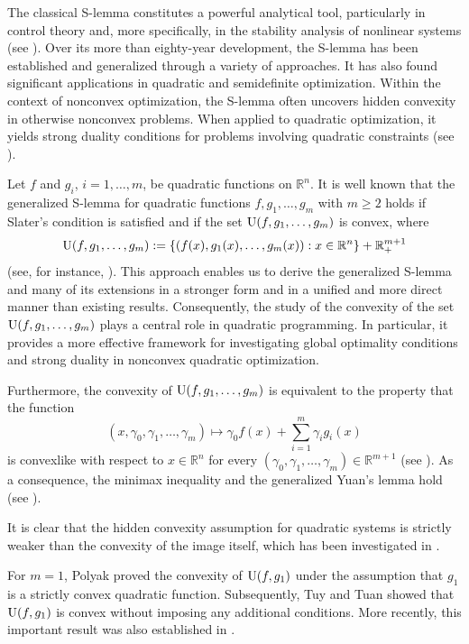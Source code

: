 \documentclass[]{interact}
\theoremstyle{plain}%
\theoremstyle{definition}
\theoremstyle{remark}
\begin{document}
	The classical S-lemma constitutes a powerful analytical tool, particularly in control theory
	and, more specifically, in the stability analysis of nonlinear systems
	(see \cite{PolikTerlaky2007}).
	Over its more than eighty-year development, the S-lemma has been established and generalized
	through a variety of approaches.
	It has also found significant applications in quadratic and semidefinite optimization.
	Within the context of nonconvex optimization, the S-lemma often uncovers hidden convexity
	in otherwise nonconvex problems.
	When applied to quadratic optimization, it yields strong duality conditions
	for problems involving quadratic constraints
	(see \cite{Tuy2016,BeckEldar2006,TuyTuan2013,JeyakumarHuyLi2009,JeyakumarLi2014,PolikTerlaky2007}).
	
	Let $f$ and $g_i$, $i=1,\ldots,m$, be quadratic functions on $\mathbb{R}^n$.
	It is well known that the generalized S-lemma for quadratic functions
	$f, g_1,\ldots,g_m$ with $m\geq 2$ holds if Slater's condition is satisfied
	and if the set ${\rm U}(f,g_1,\ldots,g_m)$ is convex, where
	$${\rm U}(f,g_1,\ldots,g_m):=
	\{(f(x), g_1(x), \ldots, g_m(x)) : x\in \mathbb{R}^n\} + \mathbb{R}^{m+1}_+$$
	(see, for instance, \cite{Fradkov1973,LaraUrruty2022}).
	This approach enables us to derive the generalized S-lemma and many of its extensions
	in a stronger form and in a unified and more direct manner than existing results.
	Consequently, the study of the convexity of the set ${\rm U}(f,g_1,\ldots,g_m)$
	plays a central role in quadratic programming.
	In particular, it provides a more effective framework for investigating
	global optimality conditions and strong duality in nonconvex quadratic optimization.
	
	
	
	Furthermore, the convexity of ${\rm U}(f,g_1,\ldots,g_m)$ is equivalent to the property that the function
	$$(x, \gamma_0, \gamma_1,\ldots, \gamma_m)\mapsto \gamma_0 f(x)+\sum_{i=1}^{m}\gamma_i g_i(x)$$
	is convexlike with respect to $x\in \mathbb{R}^n$ for every
	$(\gamma_0, \gamma_1,\ldots,\gamma_m)\in \mathbb{R}^{m+1}$
	(see \cite{Fan1953,Roubi2022}).
	As a consequence, the minimax inequality and the generalized Yuan's lemma hold
	(see \cite{Roubi2022}). 
	
	It is clear that the hidden convexity assumption for quadratic systems is strictly weaker
	than the convexity of the image itself, which has been investigated in
	\cite{Dines1941,Polyak1998,BazanOpazo2016,QuangChuSheu2022,BazanOpazo2021}.
	
	
	For $m=1$, Polyak \cite{Polyak1998} proved the convexity of ${\rm U}(f,g_1)$ under the assumption that $g_1$
	is a strictly convex quadratic function.
	Subsequently, Tuy and Tuan \cite{TuyTuan2013,Tuy2016} showed that ${\rm U}(f,g_1)$ is convex without imposing any additional conditions.
	More recently, this important result was also established in \cite{BazanOpazo2016}.
	
\end{document}

